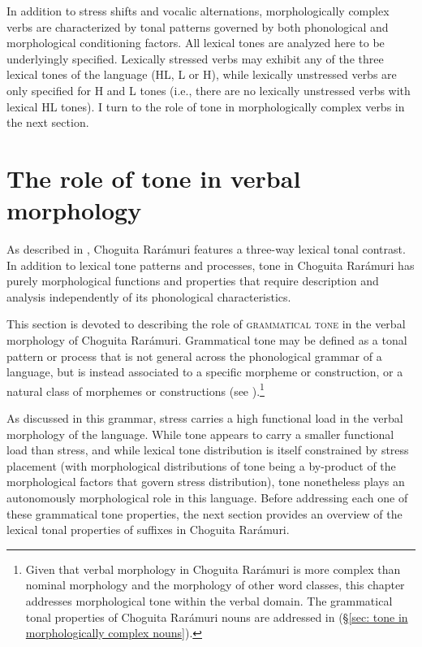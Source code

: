 In addition to stress shifts and vocalic alternations, morphologically complex verbs are characterized by tonal patterns governed by both phonological and morphological conditioning factors. All lexical tones are analyzed here to be underlyingly specified. Lexically stressed verbs may exhibit any of the three lexical tones of the language (HL, L or H), while lexically unstressed verbs are only specified for H and L tones (i.e., there are no lexically unstressed verbs with lexical HL tones). I turn to the role of tone in morphologically complex verbs in the next section.

\section{The role of tone in verbal morphology}
\label{sec: the role of tone in verbal morphology}


As described in , Choguita Rarámuri features a three-way lexical tonal contrast. In addition to lexical tone patterns and processes, tone in Choguita Rarámuri has purely morphological functions and properties that require description and analysis independently of its phonological characteristics.

This section is devoted to describing the role of \textsc{grammatical tone} in the verbal morphology of Choguita Rarámuri. Grammatical tone may be defined as a tonal pattern or process that is not general across the phonological grammar of a language, but is instead associated to a specific morpheme or construction, or a natural class of morphemes or constructions (see \citealt{rolle2018grammatical}).\footnote{Given that verbal morphology in Choguita Rarámuri is more complex than nominal morphology and the morphology of other word classes, this chapter addresses morphological tone within the verbal domain. The grammatical tonal properties of Choguita Rarámuri nouns are addressed in  (§\ref{sec: tone in morphologically complex nouns}).}

As discussed in this grammar, stress carries a high functional load in the verbal morphology of the language. While tone appears to carry a smaller functional load than stress, and while lexical tone distribution is itself constrained by stress placement (with morphological distributions of tone being a by-product of the morphological factors that govern stress distribution), tone nonetheless plays an autonomously morphological role in this language. Before addressing each one of these grammatical tone properties, the next section provides an overview of the lexical tonal properties of suffixes in Choguita Rarámuri.

